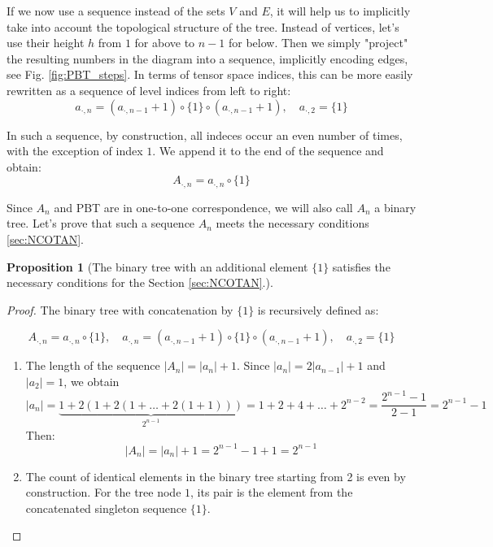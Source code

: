 \documentclass[a4paper, openany, 12pt]{article}
\newtheorem{prop}{Proposition}
\theoremstyle{remark}
\theoremstyle{definition}
\begin{document}
If we now use a sequence instead of the sets $V$ and $E$, it will help us to implicitly take into account the topological structure of the tree. Instead of vertices, let's use their height $h$ from $1$ for above to $n-1$ for below. Then we simply "project" the resulting numbers in the diagram into a sequence, implicitly encoding edges, see Fig. \ref{fig:PBT_steps}.
In terms of tensor space indices, this can be more easily rewritten as a sequence of level indices from left to right:
\begin{equation}
a_{\cdot,n} = (a_{\cdot,n-1} + 1) \circ \{1\} \circ (a_{\cdot,n-1} + 1), \quad a_{\cdot,2} = \{1\}
\end{equation}

In such a sequence, by construction, all indeces occur an even number of times, with the exception of index $1$. We append it to the end of the sequence and obtain:
\begin{equation}
A_{\cdot,n} =  a_{\cdot,n} \circ \{1\}
\end{equation}

Since $A_{n}$ and PBT are in one-to-one correspondence, we will also call $A_n$ a binary tree.
Let's prove that such a sequence $A_n$ meets the necessary conditions \ref{sec:NCOTAN}.

\begin{prop}[The binary tree with an additional element $\{1\}$ satisfies the necessary conditions for the Section \ref{sec:NCOTAN}.]
\end{prop}
\begin{proof}

The binary tree with concatenation by $\{1\}$ is recursively defined as:

\begin{equation}
A_{\cdot,n} =  a_{\cdot,n} \circ \{1\} , \quad a_{\cdot,n} = (a_{\cdot,n-1} + 1) \circ \{1\} \circ (a_{\cdot,n-1} + 1), \quad a_{\cdot,2} = \{1\}
\label{fractal_sequence}
\end{equation}
\begin{enumerate}
    \item The length of the sequence $|A_n| = |a_n|+1$. Since $|a_n| = 2|a_{n-1}|+1$ and $|a_2| = 1$, we obtain
    \begin{equation}
        |a_n| = \underbrace{1+2(1+2(1+\dots+2(1+1)))}_{2^{n-1}} = 1+2+4+\dots+2^{n-2} = \frac{2^{n-1}-1}{2-1} = 2^{n-1}-1
    \end{equation}
    Then:
    \begin{equation}
         |A_n| = |a_n|+1 = 2^{n-1}-1+1 = 2^{n-1}
    \end{equation}
    \item The count of identical elements in the binary tree starting from 2 is even by construction. For the tree node $1$, its pair is the element from the concatenated singleton sequence $\{1\}$.
\end{enumerate}
\end{proof}
\end{document}
